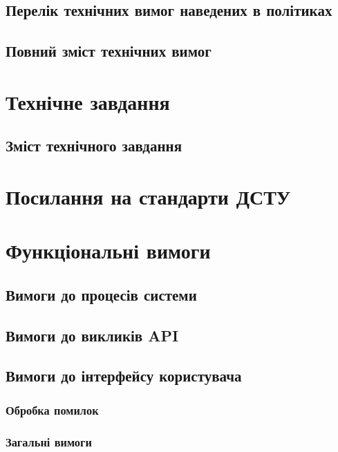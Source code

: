 \subsection{Перелік технічних вимог наведених в політиках}

\subsection{Повний зміст технічних вимог}

\section{Технічне завдання}

\subsection{Зміст технічного завдання}

\section{Посилання на стандарти ДСТУ}

\newpage
\section{Функціональні вимоги}

\subsection{Вимоги до процесів системи}

\subsection{Вимоги до викликів API}

\subsection{Вимоги до інтерфейсу користувача}

\subsubsection{Обробка помилок}

\subsubsection{Загальні вимоги}

